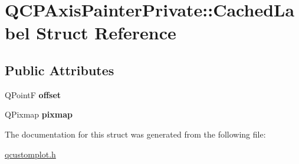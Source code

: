 \hypertarget{structQCPAxisPainterPrivate_1_1CachedLabel}{}\section{Q\+C\+P\+Axis\+Painter\+Private\+:\+:Cached\+Label Struct Reference}
\label{structQCPAxisPainterPrivate_1_1CachedLabel}
\subsection*{Public Attributes}
\begin{DoxyCompactItemize}
\item 
Q\+PointF {\bfseries offset}\hypertarget{structQCPAxisPainterPrivate_1_1CachedLabel_a5f502db71c92e572f1e6f44f62c59d8e}{}\label{structQCPAxisPainterPrivate_1_1CachedLabel_a5f502db71c92e572f1e6f44f62c59d8e}

\item 
Q\+Pixmap {\bfseries pixmap}\hypertarget{structQCPAxisPainterPrivate_1_1CachedLabel_a461597cbd470914a9d24b64d16037a88}{}\label{structQCPAxisPainterPrivate_1_1CachedLabel_a461597cbd470914a9d24b64d16037a88}

\end{DoxyCompactItemize}


The documentation for this struct was generated from the following file\+:\begin{DoxyCompactItemize}
\item 
\hyperlink{qcustomplot_8h}{qcustomplot.\+h}\end{DoxyCompactItemize}
